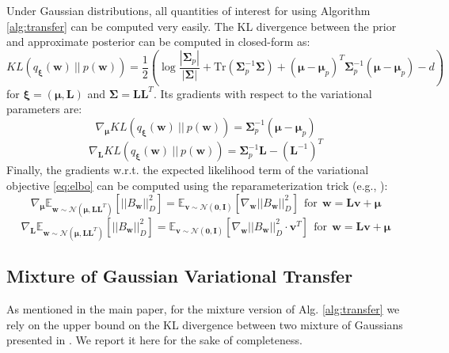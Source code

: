 \documentclass{article}
\begin{document}
Under Gaussian distributions, all quantities of interest for using Algorithm \ref{alg:transfer} can be computed very easily. The KL divergence between the prior and approximate posterior can be computed in closed-form as:
\begin{equation}
KL\left(q_{\bm{\xi}}(\bm{w})\ ||\ p(\bm{w})\right) = \frac{1}{2}\left( \log\frac{\left\lvert \bm{\Sigma}_p \right\rvert}{\left\lvert \bm{\Sigma} \right\rvert} + \text{Tr}\left( \bm{\Sigma}_p^{-1}\bm{\Sigma} \right) + (\bm{\mu} - \bm{\mu}_p)^T \bm{\Sigma}_p^{-1} (\bm{\mu} - \bm{\mu}_p) -d \right)
\end{equation}
for $\bm{\xi} = (\bm{\mu},\bm{L})$ and $\bm{\Sigma} = \bm{LL}^T$. Its gradients with respect to the variational parameters are:
\begin{equation}\label{eq:klgradmu}
\nabla_{\bm{\mu}} KL\left(q_{\bm{\xi}}(\bm{w})\ ||\ p(\bm{w})\right) = \bm{\Sigma}_p^{-1} (\bm{\mu} - \bm{\mu}_p)
\end{equation}
\begin{equation}\label{eq:klgradL}
\nabla_{\bm{L}} KL\left(q_{\bm{\xi}}(\bm{w})\ ||\ p(\bm{w})\right) = \bm{\Sigma}_p^{-1}\bm{L} - (\bm{L}^{-1})^T 
\end{equation}
Finally, the gradients w.r.t. the expected likelihood term of the variational objective \eqref{eq:elbo} can be computed using the reparameterization trick (e.g., \cite{hoffman2013stochastic,rezende2014stochastic}):
\begin{equation}\label{eq:tdgradmu}
\nabla_{\bm{\mu}} \mathbb{E}_{\bm{w} \sim \mathcal{N}(\bm{\mu},\bm{LL}^T)}\left[ ||B_{\bm{w}}||_{D}^2 \right] = \mathbb{E}_{\bm{v} \sim \mathcal{N}(\bm{0},\bm{I})}\left[ \nabla_{\bm{w}} ||B_{\bm{w}}||_{D}^2 \right]\ \ \text{for}\ \ \bm{w} = \bm{Lv} + \bm{\mu}
\end{equation} 
\begin{equation}\label{eq:tdgradL}
\nabla_{\bm{L}} \mathbb{E}_{\bm{w} \sim \mathcal{N}(\bm{\mu},\bm{LL}^T)}\left[ ||B_{\bm{w}}||_{D}^2 \right] = \mathbb{E}_{\bm{v} \sim \mathcal{N}(\bm{0},\bm{I})}\left[ \nabla_{\bm{w}} ||B_{\bm{w}}||_{D}^2 \cdot \bm{v}^T \right]\ \ \text{for}\ \ \bm{w} = \bm{Lv} + \bm{\mu}
\end{equation}

\subsection{Mixture of Gaussian Variational Transfer}

As mentioned in the main paper, for the mixture version of Alg. \ref{alg:transfer} we rely on the upper bound on the KL divergence between two mixture of Gaussians presented in \cite{hershey2007approximating}. We report it here for the sake of completeness.
\end{document}
